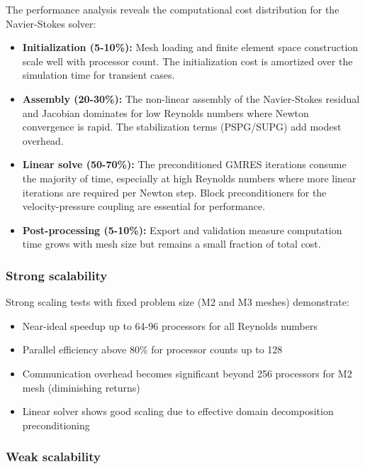 The performance analysis reveals the computational cost distribution for the Navier-Stokes solver:

\begin{itemize}
\item \textbf{Initialization (5-10\%):} Mesh loading and finite element space construction scale well with processor count. The initialization cost is amortized over the simulation time for transient cases.

\item \textbf{Assembly (20-30\%):} The non-linear assembly of the Navier-Stokes residual and Jacobian dominates for low Reynolds numbers where Newton convergence is rapid. The stabilization terms (PSPG/SUPG) add modest overhead.

\item \textbf{Linear solve (50-70\%):} The preconditioned GMRES iterations consume the majority of time, especially at high Reynolds numbers where more linear iterations are required per Newton step. Block preconditioners for the velocity-pressure coupling are essential for performance.

\item \textbf{Post-processing (5-10\%):} Export and validation measure computation time grows with mesh size but remains a small fraction of total cost.
\end{itemize}

\subsubsection{Strong scalability}

Strong scaling tests with fixed problem size (M2 and M3 meshes) demonstrate:
\begin{itemize}
\item Near-ideal speedup up to 64-96 processors for all Reynolds numbers
\item Parallel efficiency above 80\% for processor counts up to 128
\item Communication overhead becomes significant beyond 256 processors for M2 mesh (diminishing returns)
\item Linear solver shows good scaling due to effective domain decomposition preconditioning
\end{itemize}

\subsubsection{Weak scalability}


